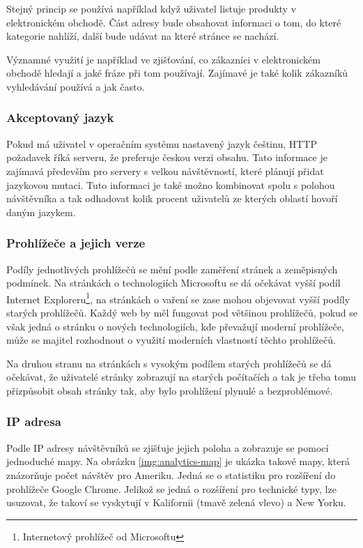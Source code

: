 \documentclass[bc,male,java,dept456]{diploma}						%
\begin{document}
\bigskip

Stejný princip se používá například když uživatel listuje produkty v elektronickém obchodě. Část adresy bude obsahovat informaci o tom, do které kategorie nahlíží, další bude udávat na které stránce se nachází.

Významné využití je například ve zjišťování, co zákazníci v elektronickém obchodě hledají a jaké fráze při tom používají. Zajímavé je také kolik zákazníků vyhledávání používá a jak často.

\subsubsection{Akceptovaný jazyk}

Pokud má uživatel v operačním systému nastavený jazyk češtinu, HTTP požadavek říká serveru, že preferuje českou verzi obsahu. Tato informace je zajímavá především pro servery s velkou návštěvností, které plánují přidat jazykovou mutaci. Tuto informaci je také možno kombinovat spolu s polohou návštěvníka a tak odhadovat kolik procent uživatelů ze kterých oblastí hovoří daným jazykem.


\subsubsection{Prohlížeče a jejich verze}

Podíly jednotlivých prohlížečů se mění podle zaměření stránek a zeměpisných podmínek. Na stránkách o technologiích Microsoftu se dá očekávat vyšší podíl Internet Exploreru\footnote{Internetový prohlížeč od Microsoftu}, na stránkách o vaření se zase mohou objevovat vyšší podíly starých prohlížečů. Každý web by měl fungovat pod většinou prohlížečů, pokud se však jedná o stránku o nových technologiích, kde převažují moderní prohlížeče, může se majitel rozhodnout o využití moderních vlastností těchto prohlížečů.

Na druhou stranu na stránkách s vysokým podílem starých prohlížečů se dá očekávat, že uživatelé stránky zobrazují na starých počítačích a tak je třeba tomu přizpůsobit obsah stránky tak, aby bylo prohlížení plynulé a bezproblémové.

\subsubsection{IP adresa}

Podle IP adresy návštěvníků se zjišťuje jejich poloha a zobrazuje se pomocí jednoduché mapy. Na obrázku \ref{img:analytics-map} je ukázka takové mapy, která znázorňuje počet návštěv pro Ameriku. Jedná se o statistiku pro rozšíření do prohlížeče Google Chrome. Jelikož se jedná o rozšíření pro technické typy, lze usuzovat, že takoví se vyskytují v Kalifornii (tmavě zelená vlevo) a New Yorku.
\end{document}
